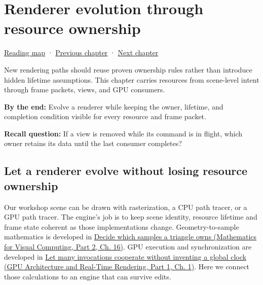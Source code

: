 \chapter{Renderer evolution through resource ownership}\label{06-engine-ii-ch025-renderer-evolution-through-resource-ownership}\hypertarget{06-engine-ii-ch025}{}\label{stagechapter:06-engine-ii-ch025}

\hypertarget{06-engine-ii-ch025-renderer-evolution-through-resource-ownership}{}

\hyperref[volume-reading-map]{Reading map} · \hyperref[05-engine-i-ch024-profiling-and-languageplatform-ownership]{Previous chapter} · \hyperref[06-engine-ii-ch026-descriptor-arrays-and-backend-limits]{Next chapter}

New rendering paths should reuse proven ownership rules rather than introduce hidden lifetime assumptions. This chapter carries resources from scene-level intent through frame packets, views, and GPU consumers.

\textbf{By the end:} Evolve a renderer while keeping the owner, lifetime, and completion condition visible for every resource and frame packet.

\textbf{Recall question:} If a view is removed while its command is in flight, which owner retains its data until the last consumer completes?

\section{Let a renderer evolve without losing resource ownership}\label{06-engine-ii-ch025-let-a-renderer-evolve-without-losing-resource-ownership}

\hypertarget{06-engine-ii-ch025-let-a-renderer-evolve-without-losing-resource-ownership}{}

Our workshop scene can be drawn with rasterization, a CPU path tracer, or a GPU path tracer. The engine's job is to keep scene identity, resource lifetime and frame state coherent as those implementations change. Geometry-to-sample mathematics is developed in \href{../02-Mathematics-for-Visual-Computing-P02/main.pdf\#nameddest=03-visual-computing-i-ch012-decide-which-samples-a-triangle-owns}{Decide which samples a triangle owns (Mathematics for Visual Computing, Part 2, Ch. 16)}. GPU execution and synchronization are developed in \href{../06-GPU-Architecture-and-Real-Time-Rendering-P01/main.pdf\#nameddest=01-foundations-i-ch008-let-many-invocations-cooperate-without-inventing-a-global-clock}{Let many invocations cooperate without inventing a global clock (GPU Architecture and Real-Time Rendering, Part 1, Ch. 1)}. Here we connect those calculations to an engine that can survive edits.

